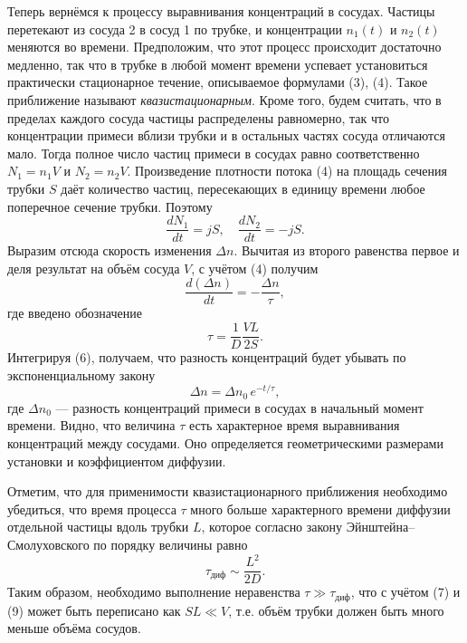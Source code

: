 \documentclass[a4paper]{article}
\begin{document}
	Теперь вернёмся к процессу выравнивания концентраций в сосудах. Частицы перетекают из сосуда 2 в сосуд 1 по трубке, и концентрации $n_1(t)$ и $n_2(t)$ меняются во времени. Предположим, что этот процесс происходит достаточно медленно, так что в трубке в любой момент времени успевает установиться практически стационарное течение, описываемое формулами (3), (4). Такое приближение называют \textit{квазистационарным}. Кроме того, будем считать, что в пределах каждого сосуда частицы распределены равномерно, так что концентрации примеси вблизи трубки и в остальных частях сосуда отличаются мало. Тогда полное число частиц примеси в сосудах равно соответственно $N_1 = n_1 V$ и $N_2 = n_2 V$. Произведение плотности потока (4) на площадь сечения трубки $S$ даёт количество частиц, пересекающих в единицу времени любое поперечное сечение трубки. Поэтому
	\begin{equation} \label{eq:balance}
		\frac{dN_1}{dt} = jS, \quad \frac{dN_2}{dt} = -jS. \tag{5}
	\end{equation}
	Выразим отсюда скорость изменения $\Delta n$. Вычитая из второго равенства первое и деля результат на объём сосуда $V$, с учётом (4) получим
	\begin{equation} \label{eq:dDelta}
		\frac{d(\Delta n)}{dt} = -\frac{\Delta n}{\tau}, \tag{6}
	\end{equation}
	где введено обозначение
	\begin{equation} \label{eq:tau}
		\tau = \frac{1}{D} \frac{V L}{2 S}. \tag{7}
	\end{equation}
	Интегрируя (6), получаем, что разность концентраций будет убывать по экспоненциальному закону
	\begin{equation} \label{eq:exp}
		\Delta n = \Delta n_0 \, e^{-t/\tau}, \tag{8}
	\end{equation}
	где $\Delta n_0$ — разность концентраций примеси в сосудах в начальный момент времени. Видно, что величина $\tau$ есть характерное время выравнивания концентраций между сосудами. Оно определяется геометрическими размерами установки и коэффициентом диффузии.
	
	Отметим, что для применимости квазистационарного приближения необходимо убедиться, что время процесса $\tau$ много больше характерного времени диффузии отдельной частицы вдоль трубки $L$, которое согласно закону Эйнштейна–Смолуховского по порядку величины равно
	\begin{equation} \label{eq:tdif}
		\tau_{\text{диф}} \sim \frac{L^2}{2D}. \tag{9}
	\end{equation}
	Таким образом, необходимо выполнение неравенства $\tau \gg \tau_{\text{диф}}$, что с учётом (7) и (9) может быть переписано как $SL \ll V$, т.е. объём трубки должен быть много меньше объёма сосудов.
	
\end{document}
